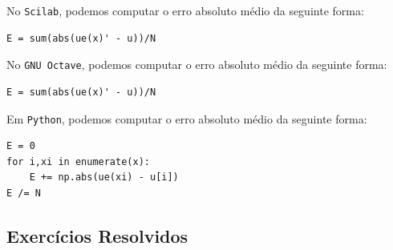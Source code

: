 \begin{sol}
\ifisscilab
No \verb+Scilab+, podemos computar o erro absoluto médio da seguinte forma:
\begin{verbatim}
E = sum(abs(ue(x)' - u))/N
\end{verbatim}
\fi
\ifisoctave
No \verb+GNU Octave+, podemos computar o erro absoluto médio da seguinte forma:
\begin{verbatim}
E = sum(abs(ue(x)' - u))/N
\end{verbatim}
\fi
\ifispython
Em \verb+Python+, podemos computar o erro absoluto médio da seguinte forma:
\begin{verbatim}
E = 0
for i,xi in enumerate(x):
    E += np.abs(ue(xi) - u[i])
E /= N
\end{verbatim}
\fi
\end{sol}

\subsection*{Exercícios Resolvidos}

